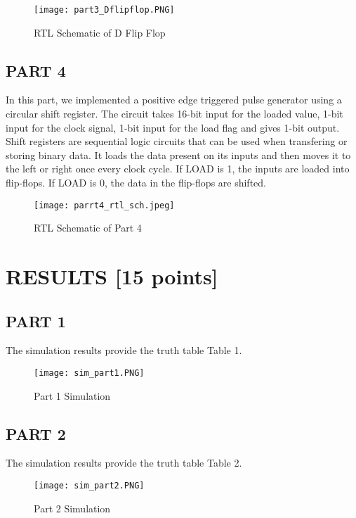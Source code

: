 \documentclass[pdftex,12pt,a4paper]{article}
\begin{document}
\begin{figure}[ht]
	\centering
	\texttt{[image: part3\_Dflipflop.PNG]}	
	\caption{RTL Schematic of D Flip Flop}
	\label{fig6}
\end{figure}

\clearpage

\subsection{PART 4}
In this part, we implemented a positive edge triggered pulse generator using a circular shift register. The circuit takes 16-bit input for the loaded value, 1-bit input for the clock signal, 1-bit input for the load flag and gives 1-bit output. Shift registers are sequential logic circuits that can be used when transfering or storing binary data. It loads the data present on its inputs and then moves it to the left or right once every clock cycle. If LOAD is 1, the inputs are loaded into flip-flops. If LOAD is 0, the data in the flip-flops are shifted.

\begin{figure}[ht]
	\centering
	\texttt{[image: parrt4\_rtl\_sch.jpeg]}	
	\caption{RTL Schematic of Part 4}
	\label{fig7}
\end{figure}

\clearpage


\section{RESULTS [15 points]}
\subsection{PART 1}
The simulation results provide the truth table Table 1.


\begin{figure}[ht]
	\centering
	\texttt{[image: sim\_part1.PNG]}	
	\caption{Part 1 Simulation}
	\label{fig8}
\end{figure}



\subsection{PART 2}
The simulation results provide the truth table Table 2.

\begin{figure}[ht]
	\centering
	\texttt{[image: sim\_part2.PNG]}	
	\caption{Part 2 Simulation}
	\label{fig9}
\end{figure}
\end{document}
